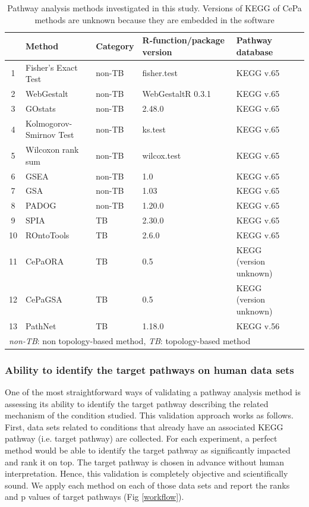 \begin{table}

\centering
\caption{Pathway analysis methods investigated in this study. Versions of KEGG of CePa methods are unknown because they are embedded in the software\label{table:PAmethods}} 
\small
\begin{tabular}{@{}clllll@{}}\hline
 & Method & Category  & R-function/package version & Pathway database \\\hline
1 & Fisher's Exact Test &	non-TB 	& fisher.test & KEGG v.65\\ 
2 & WebGestalt &	non-TB 	& WebGestaltR 0.3.1 & KEGG v.65\\ 
3 & GOstats &	non-TB 	&2.48.0 & KEGG v.65\\ 
4 & Kolmogorov-Smirnov Test& non-TB & ks.test & KEGG v.65\\
5 & Wilcoxon rank sum	& non-TB 	& wilcox.test &  KEGG v.65\\
6 & GSEA &	non-TB & 1.0 & KEGG v.65\\
7 & GSA &	non-TB & 1.03 & KEGG v.65\\
8 & PADOG &	non-TB & 1.20.0 & KEGG v.65\\
9 & SPIA &	TB  & 2.30.0 & KEGG v.65\\
10 & ROntoTools &		TB & 2.6.0 & KEGG v.65\\
11 & CePaORA &	TB & 0.5 & KEGG (version unknown)\\
12 & CePaGSA &	TB & 0.5 & KEGG (version unknown)\\
13 & PathNet &	TB & 1.18.0 & KEGG v.56\\
\hline
\multicolumn{5}{l}{\textit{non-TB}: non topology-based method, \textit{TB}: topology-based method}

\end{tabular}
\end{table}


\subsubsection{Ability to identify the target pathways on human data sets}

One of the most straightforward ways of validating a pathway analysis method is assessing its ability to identify the target pathway describing the related mechanism of the condition studied. 
This validation approach works as follows. First, data sets related to  conditions that already have an associated KEGG pathway (i.e. target pathway) are collected. For each experiment, a perfect method would be able to identify the target pathway as significantly impacted and rank it on top. The target pathway is chosen in advance without human interpretation. Hence, this validation is completely objective and scientifically sound. We apply each method on each of those data sets and report the ranks and p values of target pathways (Fig \ref{workflow}).

